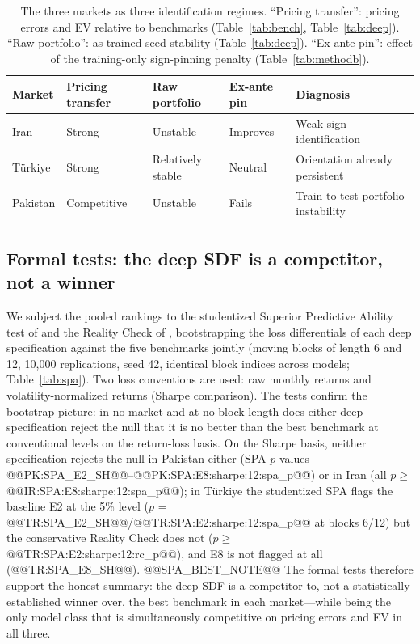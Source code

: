 \documentclass[12pt]{article}
\begin{document}
\begin{table}[htbp]
\centering
\small
\caption{The three markets as three identification regimes. ``Pricing transfer'': pricing errors and EV relative to benchmarks (Table~\ref{tab:bench}, Table~\ref{tab:deep}). ``Raw portfolio'': as-trained seed stability (Table~\ref{tab:deep}). ``Ex-ante pin'': effect of the training-only sign-pinning penalty (Table~\ref{tab:methodb}).}
\label{tab:diagnosis}
\footnotesize
\begin{tabular}{l llll}
\toprule
Market & Pricing transfer & Raw portfolio & Ex-ante pin & Diagnosis \\
\midrule
Iran & Strong & Unstable & Improves & Weak sign identification \\
T\"urkiye & Strong & Relatively stable & Neutral & Orientation already persistent \\
Pakistan & Competitive & Unstable & Fails & Train-to-test portfolio instability \\
\bottomrule
\end{tabular}
\end{table}

\subsection{Formal tests: the deep SDF is a competitor, not a winner}\label{sec:spa}

We subject the pooled rankings to the studentized Superior Predictive Ability test of \citet{hansen2005} and the Reality Check of \citet{white2000}, bootstrapping the loss differentials of each deep specification against the five benchmarks jointly (moving blocks of length 6 and 12, 10{,}000 replications, seed 42, identical block indices across models; Table~\ref{tab:spa}). Two loss conventions are used: raw monthly returns and volatility-normalized returns (Sharpe comparison). The tests confirm the bootstrap picture: in no market and at no block length does either deep specification reject the null that it is no better than the best benchmark at conventional levels on the return-loss basis. On the Sharpe basis, neither specification rejects the null in Pakistan either (SPA $p$-values @@PK:SPA_E2_SH@@--@@PK:SPA:E8:sharpe:12:spa_p@@) or in Iran (all $p\ge$ @@IR:SPA:E8:sharpe:12:spa_p@@); in T\"urkiye the studentized SPA flags the baseline E2 at the 5\% level ($p$ = @@TR:SPA_E2_SH@@/@@TR:SPA:E2:sharpe:12:spa_p@@ at blocks 6/12) but the conservative Reality Check does not ($p\ge$ @@TR:SPA:E2:sharpe:12:rc_p@@), and E8 is not flagged at all (@@TR:SPA_E8_SH@@). @@SPA_BEST_NOTE@@ The formal tests therefore support the honest summary: the deep SDF is a competitor to, not a statistically established winner over, the best benchmark in each market---while being the only model class that is simultaneously competitive on pricing errors and EV in all three.
\end{document}
